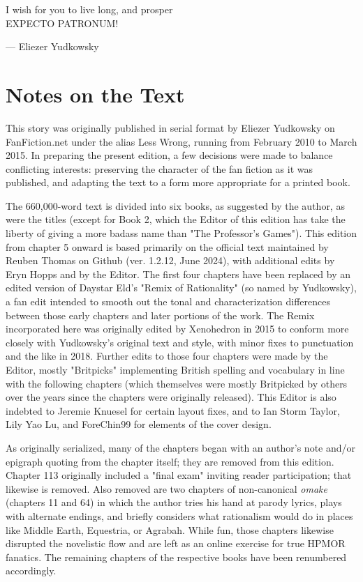 I wish for you to live long, and prosper\\
EXPECTO PATRONUM!

— Eliezer Yudkowsky

\chapter*{Notes on the Text}

This story was originally published in serial format by Eliezer Yudkowsky on FanFiction.net under the alias Less Wrong, running from February 2010 to March 2015. 
In preparing the present edition, a few decisions were made to
balance conflicting interests: preserving the character of the fan fiction as
it was published, and adapting the text to a form more appropriate for a
printed book.

The 660,000-word text is divided into six books, as suggested by the author, as were the titles
(except for Book 2, which the Editor of this edition has take the liberty of giving a more badass name than "The Professor's Games").
This edition from chapter 5 onward is based primarily on
the official text maintained by Reuben Thomas on Github (ver. 1.2.12, June 2024),
with additional edits by Eryn Hopps and by the Editor.
The first four chapters have been replaced by an edited version of Daystar Eld's "Remix of Rationality" (so named by Yudkowsky),
a fan edit intended to smooth out the tonal and characterization differences between those early chapters and later portions of the work.
The Remix incorporated here was originally edited by Xenohedron in 2015 to conform more closely with Yudkowsky's original text and style,
with minor fixes to punctuation and the like in 2018. Further edits to those four chapters were made by the Editor,
mostly "Britpicks" implementing British spelling and vocabulary in line with the following chapters
(which themselves were mostly Britpicked by others over the years since the chapters were originally released).
This Editor is also indebted to Jeremie Knuesel for certain layout fixes,
and to Ian Storm Taylor, Lily Yao Lu, and ForeChin99 for elements of the cover design.

As originally serialized, many of the chapters began with an author's note and/or epigraph quoting from the chapter itself;
they are removed from this edition. 
Chapter 113 originally included a "final exam" inviting reader participation; that likewise is removed.
Also removed are two chapters of non-canonical \emph{omake}
(chapters 11 and 64) in which the author tries his hand at parody lyrics, plays with alternate endings, and briefly considers
what rationalism would do in places like Middle Earth, Equestria, or Agrabah.
While fun, those chapters likewise disrupted the novelistic flow and are left as an online exercise for true HPMOR fanatics. 
The remaining chapters of the respective books have been renumbered accordingly.

